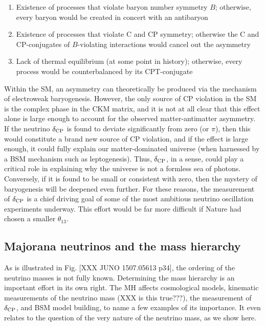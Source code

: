 \documentclass[../thesis.tex]{subfiles}
\begin{document}
\begin{enumerate}
\item Existence of processes that violate baryon number symmetry $B$; otherwise,
  every baryon would be created in concert with an antibaryon
\item Existence of processes that violate C and CP symmetry; otherwise the C and
  CP-conjugates of $B$-violating interactions would cancel out the asymmetry
\item Lack of thermal equilibrium (at some point in history); otherwise, every
  process would be counterbalanced by its CPT-conjugate
\end{enumerate}

Within the SM, an asymmetry can theoretically be produced via the mechanism of
electroweak baryogenesis. However, the only source of CP violation in the SM is
the complex phase in the CKM matrix, and it is not at all clear that this effect
alone is large enough to account for the observed matter-antimatter
asymmetry. If the neutrino $\delta_\text{CP}$ is found to deviate significantly from zero
(or $\pi$), then this would constitute a brand new source of CP violation, and
if the effect is large enough, it could fully explain our matter-dominated
universe (when harnessed by a BSM mechanism such as leptogenesis). Thus, $\delta_\text{CP}$,
in a sense, could play a critical role in explaining why the universe is not a
formless sea of photons. Conversely, if it is found to be small or consistent
with zero, then the mystery of baryogenesis will be deepened even further. For
these reasons, the measurement of $\delta_\text{CP}$ is a chief driving goal of some of the
most ambitious neutrino oscillation experiments underway. This effort would be
far more difficult if Nature had chosen a smaller $\theta_{13}$.

\subsection{Majorana neutrinos and the mass hierarchy}
\label{sec:majorana}

As is illustrated in Fig. [XXX JUNO 1507.05613 p34], the ordering of the
neutrino masses is not fully known. Determining the mass hierarchy is an
important effort in its own right. The MH affects cosmological models, kinematic
measurements of the neutrino mass (XXX is this true???), the measurement of
$\delta_\text{CP}$, and BSM model building, to name a few examples of its importance. It
even relates to the question of the very nature of the neutrino mass, as we show
here.
\end{document}
